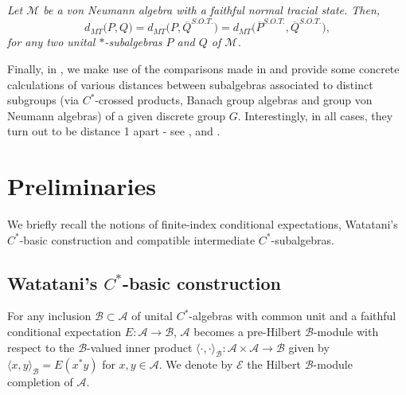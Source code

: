 \documentclass{amsart}
\numberwithin{equation}{section}
\newcommand{\mcal}{\mathcal}
\newcommand{\1}{\mathbf{1}}
\newcommand{\mA}{\mathcal{A}}
\newcommand{\mB}{\mathcal{B}}
\newcommand{\mM}{\mathcal{M}}
\begin{document}
   {\it Let $\mM$ be a  von
    Neumann algebra with a faithful normal tracial state.  Then,
\[
d_{MT}\big(P, Q\big) = d_{MT}\Big(P, \overline{Q}^{S.O.T.}\Big) =
d_{MT}\Big(\overline{P}^{S.O.T.}, \overline{Q}^{S.O.T.}\Big),
\] 
for any two unital $*$-subalgebras $P$ and $Q$ of  $\mM$.    
  }
\smallskip

Finally, in , we make use of the comparisons made
in  and provide some concrete calculations of
various distances between subalgebras associated to distinct subgroups
(via $C^*$-crossed products, Banach group algebras and group von
Neumann algebras) of a given discrete group $G$. Interestingly, in all
cases, they turn out to be distance 1 apart - see
,
 and .

  
\section{Preliminaries}\label{index-basic-construction}\label{prelims}
We briefly recall the notions of finite-index conditional
expectations, Watatani's $C^*$-basic construction and compatible
intermediate $C^*$-subalgebras.


\subsection{Watatani's $C^*$-basic construction}
For any inclusion $\mB \subset \mA$ of unital $C^*$-algebras with common
unit and a faithful conditional expectation $E: \mA \to \mB$, $\mA$ becomes
a pre-Hilbert $\mB$-module with respect to the $\mB$-valued inner product
$\langle \cdot, \cdot \rangle_{\mB} : \mA \times \mA \to \mB$ given by $\langle
x, y \rangle_{\mB} = E(x^* y)$ for $x, y \in \mA$. We denote by $\mcal{E}$
the Hilbert $\mB$-module completion of $\mA$.
\end{document}
